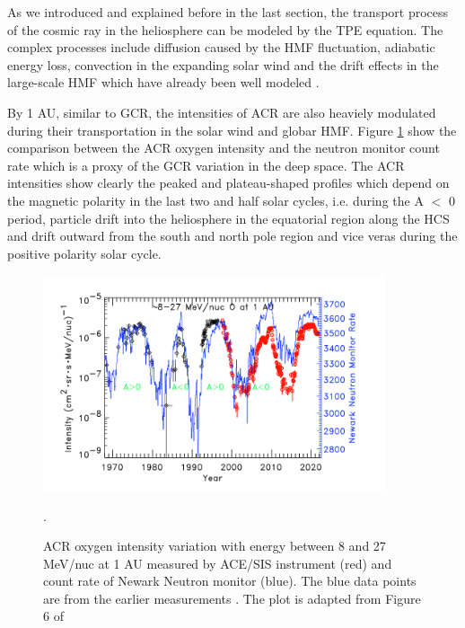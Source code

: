 As we introduced and explained before in the last section, the transport process of the cosmic ray in the heliosphere can be modeled by the TPE equation. The complex processes include diffusion caused by the \ac{HMF} fluctuation, adiabatic energy loss, convection in the expanding solar wind and the drift effects in the large-scale \ac{HMF} which have already been well modeled \citep{Parker1965Pss, Jokipii1977ApJ, Jokipii1981ApJ}.

By 1 AU, similar to \ac{GCR}, the intensities of \ac{ACR} are also heaviely modulated during their transportation in the solar wind and globar \ac{HMF}. Figure \ref{Fig:ACR_solarmodulation} show the comparison between the ACR oxygen intensity and the neutron monitor count rate which is a proxy of the GCR variation in the deep space. The \ac{ACR} intensities show clearly the peaked and plateau-shaped profiles which depend on the magnetic polarity in the last two and half solar cycles, i.e. during the A $<$ 0 period, particle drift into the heliosphere in the equatorial region along the \ac{HCS} and drift outward from the south and north pole region and vice veras during the positive polarity solar cycle.



\begin{figure}
	\centering
	\includegraphics[width = 0.9\textwidth]{images/ACR_solarmodulation.png}
	\caption[Long term variation of \ac{ACR} oxygen and neutron monitor count rate]{ACR oxygen intensity variation with energy between 8 and 27 MeV/nuc at 1 AU measured by ACE/SIS instrument (red) and count rate of Newark Neutron monitor (blue). The blue data points are from the earlier measurements \citep{Mewaldt1993GeoRL}. The plot is adapted from Figure 6 of \citet{Giacalone2022SSRv}}.
	\label{Fig:ACR_solarmodulation}
\end{figure}


